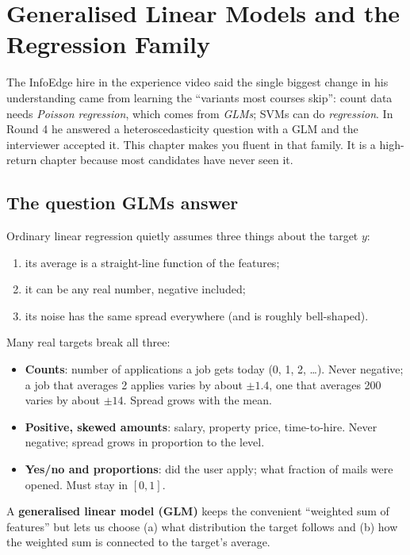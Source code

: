 \chapter{Generalised Linear Models and the Regression Family}

The InfoEdge hire in the experience video said the single biggest change in his understanding came from
learning the ``variants most courses skip'': count data needs \emph{Poisson regression}, which comes from
\emph{GLMs}; SVMs can do \emph{regression}. In Round 4 he answered a heteroscedasticity question with a GLM and the
interviewer accepted it. This chapter makes you fluent in that family. It is a high-return chapter because most
candidates have never seen it.

\section{The question GLMs answer}

Ordinary linear regression quietly assumes three things about the target $y$:
\begin{enumerate}
\item its average is a straight-line function of the features;
\item it can be any real number, negative included;
\item its noise has the same spread everywhere (and is roughly bell-shaped).
\end{enumerate}
Many real targets break all three:
\begin{itemize}
\item \textbf{Counts}: number of applications a job gets today (0, 1, 2, \dots). Never negative; a job that
  averages 2 applies varies by about $\pm1.4$, one that averages 200 varies by about $\pm14$. Spread grows with the mean.
\item \textbf{Positive, skewed amounts}: salary, property price, time-to-hire. Never negative; spread grows in
  proportion to the level.
\item \textbf{Yes/no and proportions}: did the user apply; what fraction of mails were opened. Must stay in $[0,1]$.
\end{itemize}
A \textbf{generalised linear model (GLM)} keeps the convenient ``weighted sum of features'' but lets us choose
(a) what distribution the target follows and (b) how the weighted sum is connected to the target's average.

